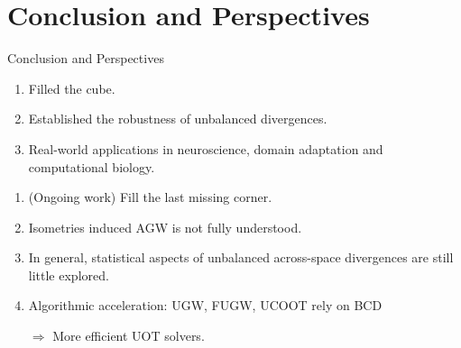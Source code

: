 \documentclass{beamer}
\begin{document}
\section{Conclusion and Perspectives}
\begin{frame}{Conclusion and Perspectives}
\scriptsize

{}
\begin{enumerate}
  \item Filled the cube.
  \item Established the robustness of unbalanced divergences.
  \item Real-world applications in neuroscience, domain adaptation and computational biology.
\end{enumerate}

\vspace{1cm}
{}
\begin{enumerate}
  \item (Ongoing work) Fill the last missing corner.
  \item Isometries induced AGW is not fully understood.
  \item In general, statistical aspects of unbalanced across-space divergences
  are still little explored.
  \item Algorithmic acceleration: UGW, FUGW, UCOOT rely on BCD

  $\Rightarrow$ More efficient UOT solvers.


\end{enumerate}
\end{frame}
\end{document}
